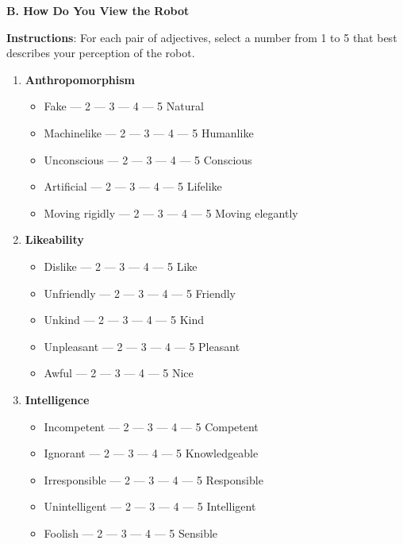 \documentclass[runningheads]{llncs}
\begin{document}
\textbf{B. How Do You View the Robot}

\textbf{Instructions}: For each pair of adjectives, select a number from 1 to 5 that best describes your perception of the robot.

\begin{enumerate}
    \item \textbf{Anthropomorphism}
    \begin{itemize}
        \item Fake  --- 2 --- 3 --- 4 --- 5 \dotfill Natural
        \item Machinelike  --- 2 --- 3 --- 4 --- 5 \dotfill Humanlike
        \item Unconscious  --- 2 --- 3 --- 4 --- 5 \dotfill Conscious
        \item Artificial  --- 2 --- 3 --- 4 --- 5 \dotfill Lifelike
        \item Moving rigidly  --- 2 --- 3 --- 4 --- 5 \dotfill Moving elegantly
    \end{itemize}
    \item \textbf{Likeability}
    \begin{itemize}
        \item Dislike  --- 2 --- 3 --- 4 --- 5 \dotfill Like
        \item Unfriendly  --- 2 --- 3 --- 4 --- 5 \dotfill Friendly
        \item Unkind  --- 2 --- 3 --- 4 --- 5 \dotfill Kind
        \item Unpleasant  --- 2 --- 3 --- 4 --- 5 \dotfill Pleasant
        \item Awful  --- 2 --- 3 --- 4 --- 5 \dotfill Nice
    \end{itemize}
    \item \textbf{Intelligence}
    \begin{itemize}
        \item Incompetent  --- 2 --- 3 --- 4 --- 5 \dotfill Competent
        \item Ignorant  --- 2 --- 3 --- 4 --- 5 \dotfill Knowledgeable
        \item Irresponsible  --- 2 --- 3 --- 4 --- 5 \dotfill Responsible
        \item Unintelligent  --- 2 --- 3 --- 4 --- 5 \dotfill Intelligent
        \item Foolish  --- 2 --- 3 --- 4 --- 5 \dotfill Sensible
    \end{itemize}
\end{enumerate}
\end{document}
